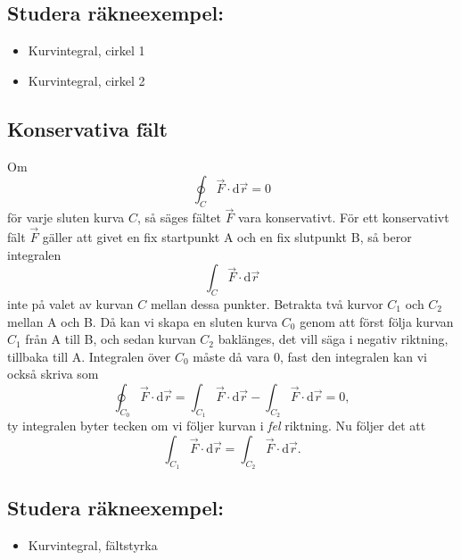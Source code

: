 \documentclass[%
oneside,                 %
final,                   %
10pt]{article}
\begin{document}
\subsection{Studera räkneexempel:}
\begin{itemize}
\item Kurvintegral, cirkel 1

\item Kurvintegral, cirkel 2
\end{itemize}

\noindent
\subsection{Konservativa fält}
Om 
\begin{equation}
  \oint_C \vec{F} \cdot\mbox{d}\vec{r} = 0
\end{equation}
för varje sluten kurva $C$, så säges fältet $\vec{F}$ vara konservativt.  För ett konservativt fält $\vec{F}$ gäller att givet en fix startpunkt A och en fix slutpunkt B, så beror integralen
\begin{equation}
  \int_C \vec{F} \cdot\mbox{d}\vec{r}
\end{equation}
inte på valet av kurvan $C$ mellan dessa punkter.  Betrakta två kurvor $C_1$ och $C_2$ mellan A och B.  Då kan vi skapa en sluten kurva $C_0$ genom att först följa kurvan $C_1$ från A till B, och sedan kurvan $C_2$ baklänges, det vill säga i negativ riktning, tillbaka till A. Integralen över $C_0$ måste då vara 0, fast den integralen kan vi också skriva som
\begin{equation}
  \oint_{C_0} \vec{F} \cdot\mbox{d}\vec{r} = \int_{C_1} 
\vec{F} \cdot\mbox{d}\vec{r} - \int_{C_2} \vec{F} \cdot\mbox{d}\vec{r} = 0,
\end{equation}
ty integralen byter tecken om vi följer kurvan i \emph{fel} riktning. Nu följer det att 
\begin{equation}
  \int_{C_1} \vec{F} \cdot\mbox{d}\vec{r} = \int_{C_2} \vec{F} \cdot\mbox{d}
\vec{r}.
\end{equation}

\subsection{Studera räkneexempel:}
\begin{itemize}
\item Kurvintegral, fältstyrka
\end{itemize}

\noindent
\end{document}
